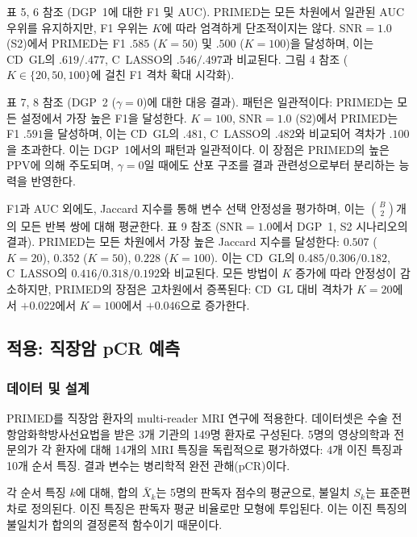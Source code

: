 \documentclass[a4paper,11pt]{article}
\begin{document}
표 5, 6 참조 (DGP~1에 대한 F1 및 AUC).
PRIMED는 모든 차원에서 일관된 AUC 우위를 유지하지만, F1 우위는 $K$에 따라 엄격하게 단조적이지는 않다.
$\mathrm{SNR} = 1.0$ (S2)에서 PRIMED는 F1 $.585$ ($K = 50$) 및 $.500$ ($K = 100$)을 달성하며, 이는 CD~GL의 $.619/.477$, C~LASSO의 $.546/.497$과 비교된다.
그림 4 참조 ($K \in \{20, 50, 100\}$에 걸친 F1 격차 확대 시각화).

표 7, 8 참조 (DGP~2 ($\gamma = 0$)에 대한 대응 결과).
패턴은 일관적이다: PRIMED는 모든 설정에서 가장 높은 F1을 달성한다.
$K = 100$, $\mathrm{SNR} = 1.0$ (S2)에서 PRIMED는 F1 $.591$을 달성하며, 이는 CD~GL의 $.481$, C~LASSO의 $.482$와 비교되어 격차가 $.100$을 초과한다. 이는 DGP~1에서의 패턴과 일관적이다.
이 장점은 PRIMED의 높은 PPV에 의해 주도되며, $\gamma = 0$일 때에도 산포 구조를 결과 관련성으로부터 분리하는 능력을 반영한다.

F1과 AUC 외에도, Jaccard 지수를 통해 변수 선택 안정성을 평가하며, 이는 $\binom{B}{2}$개의 모든 반복 쌍에 대해 평균한다.
표 9 참조 ($\mathrm{SNR} = 1.0$에서 DGP~1, S2 시나리오의 결과).
PRIMED는 모든 차원에서 가장 높은 Jaccard 지수를 달성한다: $0.507$ ($K = 20$), $0.352$ ($K = 50$), $0.228$ ($K = 100$). 이는 CD~GL의 $0.485/0.306/0.182$, C~LASSO의 $0.416/0.318/0.192$와 비교된다.
모든 방법이 $K$ 증가에 따라 안정성이 감소하지만, PRIMED의 장점은 고차원에서 증폭된다: CD~GL 대비 격차가 $K = 20$에서 $+0.022$에서 $K = 100$에서 $+0.046$으로 증가한다.

\subsection{적용: 직장암 pCR 예측}\label{sec:application}

\subsubsection{데이터 및 설계}

PRIMED를 직장암 환자의 multi-reader MRI 연구에 적용한다.
데이터셋은 수술 전 항암화학방사선요법을 받은 3개 기관의 149명 환자로 구성된다.
5명의 영상의학과 전문의가 각 환자에 대해 14개의 MRI 특징을 독립적으로 평가하였다: 4개 이진 특징과 10개 순서 특징.
결과 변수는 병리학적 완전 관해(pCR)이다.

각 순서 특징 $k$에 대해, 합의 $\bar X_k$는 5명의 판독자 점수의 평균으로, 불일치 $S_k$는 표준편차로 정의된다.
이진 특징은 판독자 평균 비율로만 모형에 투입된다. 이는 이진 특징의 불일치가 합의의 결정론적 함수이기 때문이다.
\end{document}
